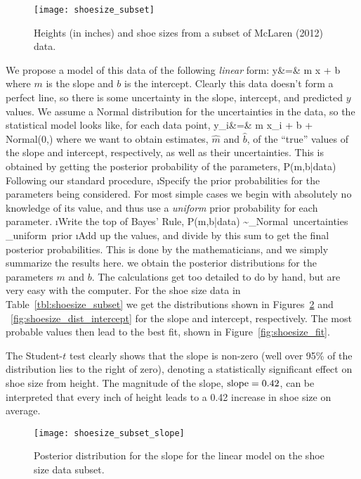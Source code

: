 \begin{figure}
\texttt{[image: shoesize\_subset]}
\label{fig:shoesize_subset}
\caption{Heights (in inches) and shoe sizes from a subset of McLaren (2012) data.}
\end{figure}

We propose a model of this data of the following {\em linear} form:
\beqn
y&=& m x + b
\eeqn
where $m$ is the slope and $b$ is the intercept.  Clearly this data doesn't form a perfect line, so there is some uncertainty in the slope, intercept, and predicted $y$ values.  We assume a Normal distribution for the uncertainties in the data, so the statistical model looks like, for each data point,
\beqn
y_{i}&=& m x_{i} + b + {\rm Normal}(0,\sigma)
\eeqn
where we want to obtain estimates,  $\hat{m}$ and $\hat{b}$, of the ``true'' values of the slope and intercept, respectively, as well as their uncertainties.  This is obtained by getting the posterior probability of the parameters,
\beqn
P(m,b|{\rm data})
\eeqn
Following our standard procedure,
\be
\i Specify the prior probabilities for the parameters being considered.  For most simple cases we begin with absolutely no knowledge of its value, and thus use a {\em uniform} prior probability for each parameter.
\i Write the top of Bayes' Rule, 
\beqn
P(m,b|{\rm data}) \sim {}_{\mbox{\scriptsize Normal uncertainties}} \times {}_{\mbox{\scriptsize uniform prior}}
\eeqn
\i Add up the values, and divide by this sum to get the final posterior probabilities.  This is done by the mathematicians, and we simply summarize the results here.
\ee
we obtain the posterior distributions for the parameters $m$ and $b$.  The calculations get too detailed to do by hand, but are very easy with the computer.  For the shoe size data in Table~\ref{tbl:shoesize_subset} we get the distributions shown in Figures~\ref{fig:shoesize_dist_slope} and ~\ref{fig:shoesize_dist_intercept} for the slope and intercept, respectively.  The most probable values then lead to the best fit, shown in Figure~\ref{fig:shoesize_fit}.

The Student-$t$ test clearly shows that the slope is non-zero (well over 95\% of the distribution lies to the right of zero), denoting a statistically significant effect on shoe size from height.  The magnitude of the slope, ${\rm slope}=0.42$, can be interpreted that every inch of height leads to a 0.42 increase in shoe size on average.


\begin{figure}
\texttt{[image: shoesize\_subset\_slope]}
\caption{Posterior distribution for the slope for the linear model on the shoe size data subset.}\label{fig:shoesize_dist_slope}
\end{figure}


